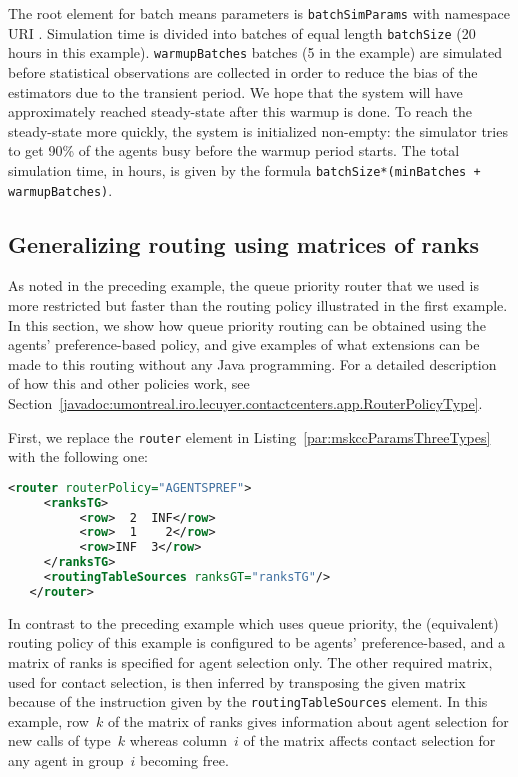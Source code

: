 The root element for batch means parameters is
\texttt{batch\-Sim\-Params} %
with namespace URI .
Simulation time is divided into batches of equal length \texttt{batch\-Size}
(20 hours in this example).  \texttt{warmup\-Batches} batches (5 in the
example) are simulated before statistical observations are collected in
order to reduce the bias of the estimators due to the transient period.
We hope that the system will have approximately reached steady-state after
this warmup is done.
To reach the steady-state more quickly, the system is initialized
non-empty:  the simulator tries to get 90\% of the agents busy before
the warmup period starts.
The total simulation time, in hours, is given by the formula
\texttt{batchSize*(minBatches + warmupBatches)}.

\subsection{Generalizing routing using matrices of ranks}
\label{sec:mskccParamsThreeTypesRanks}

As noted in the preceding example, the queue
priority router that we
used is more restricted but faster than the routing policy illustrated
in the first example.
In this section, we show how queue priority
routing can be obtained
using the agents' preference-based policy, and
give examples of what extensions can be made to this routing without
any Java programming.
For a detailed description of how this and other policies work,
see Section~\ref{javadoc:umontreal.iro.lecuyer.contactcenters.app.RouterPolicyType}.

First, we replace the \texttt{router} element in
Listing~\ref{par:mskccParamsThreeTypes} with the following one:
\begin{lstlisting}[language=XML]
   <router routerPolicy="AGENTSPREF">
     <ranksTG>
          <row>  2  INF</row>
          <row>  1    2</row>
          <row>INF  3</row>
     </ranksTG>
     <routingTableSources ranksGT="ranksTG"/>
   </router>
\end{lstlisting}

In contrast to the preceding example which uses queue priority,
the (equivalent) routing policy
of this example is configured to be agents' preference-based,
and a matrix of ranks is specified for agent selection only.
The other required matrix, used for contact selection, is then inferred
by transposing the given matrix because of the
instruction given by the \texttt{routing\-Table\-Sources} element.
In this example, row~$k$ of the matrix of ranks
gives information about
agent selection for new calls of type~$k$
whereas column~$i$ of the matrix affects
contact selection for any agent in group~$i$ becoming free.

